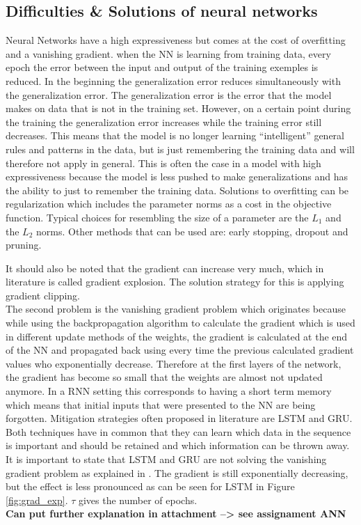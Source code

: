 \subsection{Difficulties \& Solutions of neural networks}\label{s:Problems}
Neural Networks have a high expressiveness but comes at the cost of overfitting and a vanishing gradient.
when the NN is learning from training data, every epoch the error between the input and output of the training exemples is reduced. In the beginning the generalization error reduces simultaneously with the generalization error. The generalization error is the error that the model makes on data that is not in the training set. However, on a certain point during the training the generalization error increases while the training error still decreases. This means that the model is no longer learning ``intelligent'' general rules and patterns in the data, but is just remembering the training data and will therefore not apply in general. This is often the case in a model with high expressiveness because the model is less pushed to make generalizations and has the ability to just to remember the training data. Solutions to overfitting can be regularization which includes the parameter norms as a cost in the objective function. Typical choices for resembling the size of a parameter are the $ L_1 $ and the $ L_2 $ norms. Other methods that can be used are: early stopping, dropout and pruning.

It should also be noted that the gradient can increase very much, which in literature is called gradient explosion. The solution strategy for this is applying gradient clipping.\\

The second problem is the vanishing gradient problem which originates because while using the backpropagation algorithm to calculate the gradient which is used in different update methods of the weights, the gradient is calculated at the end of the NN and propagated back using every time the previous calculated gradient values who exponentially decrease. Therefore at the first layers of the network, the gradient has become so small that the weights are almost not updated anymore. In a RNN setting this corresponds to having a short term memory which means that initial inputs that were presented to the NN are being forgotten. Mitigation strategies often proposed in literature are LSTM and GRU. Both techniques have in common that they can learn which data in the sequence is important and should be retained and which information can be thrown away. It is important to state that LSTM and GRU are not solving the vanishing gradient problem as explained in \cite{Teuwen2019}. The gradient is still exponentially decreasing, but the effect is less pronounced as can be seen for LSTM in Figure \ref{fig:grad_exp}. $ \tau $ gives the number of epochs.\\ \textbf{Can put further explanation in attachment --> see assignament ANN}

